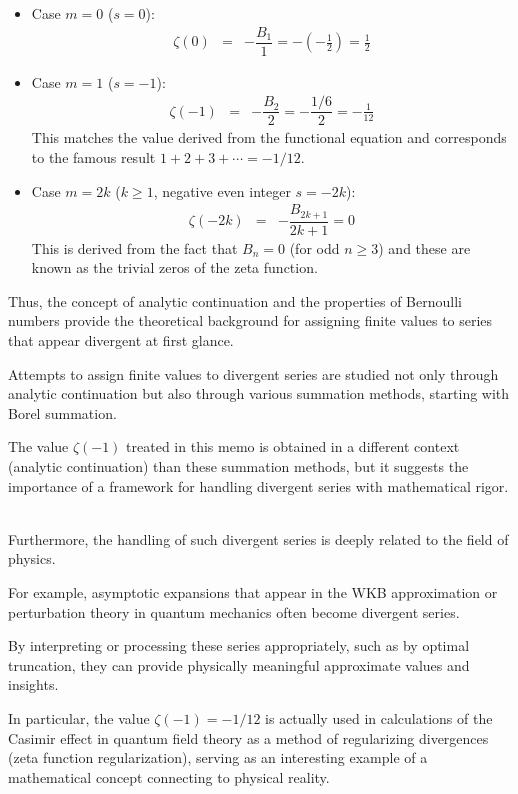 \documentclass[uplatex,a4j,12pt,dvipdfmx]{jsarticle}
\begin{document}
\begin{itemize}
	\item Case $m=0$ ($s=0$):
	      \begin{eqnarray}
		      \zeta(0)
		      &=&
		      -
		      \dfrac{B_{1}}{1}
		      =
		      - \left( - \frac{1}{2} \right)
		      =
		      \frac{1}{2}
	      \end{eqnarray}

	\item Case $m=1$ ($s=-1$):
	      \begin{eqnarray}
		      \zeta(-1)
		      &=&
		      -
		      \dfrac{B_{2}}{2}
		      =
		      - \dfrac{1/6}{2}
		      =
		      - \frac{1}{12}
	      \end{eqnarray}
	      This matches the value derived from the functional equation and corresponds to the famous result $1+2+3+\cdots = -1/12$.

	\item Case $m=2k$ ($k \ge 1$, negative even integer $s=-2k$):
	      \begin{eqnarray}
		      \zeta(-2k)
		      &=&
		      -
		      \dfrac{B_{2k+1}}{2k+1}
		      =
		      0
	      \end{eqnarray}
	      This is derived from the fact that $B_n=0$ (for odd $n \ge 3$) and these are known as the trivial zeros of the zeta function.
\end{itemize}

Thus, the concept of analytic continuation and the properties of Bernoulli numbers provide the theoretical background for assigning finite values to series that appear divergent at first glance.

Attempts to assign finite values to divergent series are studied not only through analytic continuation but also through various summation methods, starting with Borel summation.

The value $\zeta(-1)$ treated in this memo is obtained in a different context (analytic continuation) than these summation methods, but it suggests the importance of a framework for handling divergent series with mathematical rigor.

\ \\

Furthermore, the handling of such divergent series is deeply related to the field of physics.

For example, asymptotic expansions that appear in the WKB approximation or perturbation theory in quantum mechanics often become divergent series.

By interpreting or processing these series appropriately, such as by optimal truncation, they can provide physically meaningful approximate values and insights.

In particular, the value $\zeta(-1)=-1/12$ is actually used in calculations of the Casimir effect in quantum field theory as a method of regularizing divergences (zeta function regularization), serving as an interesting example of a mathematical concept connecting to physical reality.
\end{document}
